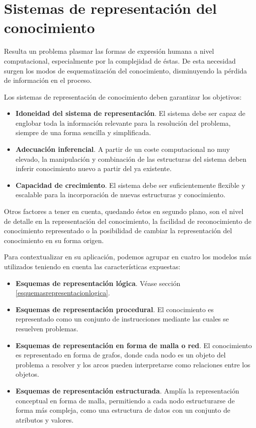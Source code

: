 \documentclass[a4paper, 11pt, titlepage]{article}
\begin{document}

\section{Sistemas de representación del conocimiento}

    Resulta un problema plasmar las formas de expresión humana a nivel computacional, especialmente
    por la complejidad de éstas. De esta necesidad surgen los modos de esquematización del 
    conocimiento, disminuyendo la pérdida de información en el proceso.

    Los sistemas de representación de conocimiento deben garantizar los objetivos:

    \begin{itemize}
        \item \textbf{Idoneidad del sistema de representación}. El sistema debe ser capaz de 
        englobar toda la información relevante para la resolución del problema, siempre de una 
        forma sencilla y simplificada.
        \item \textbf{Adecuación inferencial}. A partir de un coste computacional no muy elevado,
        la manipulación y combinación de las estructuras del sistema deben inferir conocimiento 
        nuevo a partir del ya existente.
        \item \textbf{Capacidad de crecimiento}. El sistema debe ser suficientemente flexible y 
        escalable para la incorporación de nuevas estructuras y conocimiento.
    \end{itemize}

    Otros factores a tener en cuenta, quedando éstos en segundo plano, son el nivel de detalle 
    en la representación del conocimiento, la facilidad de reconocimiento de conocimiento 
    representado o la posibilidad de cambiar la representación del conocimiento en su forma 
    origen.

    Para contextualizar en su aplicación, podemos agrupar en cuatro los modelos más utilizados 
    teniendo en cuenta las características expuestas:

    \begin{itemize}
        \item \textbf{Esquemas de representación lógica}. Véase sección \ref{esquemasrepresentacionlogica}.
        \item \textbf{Esquemas de representación procedural}. El conocimiento es representado 
        como un conjunto de instrucciones mediante las cuales se resuelven problemas.
        \item \textbf{Esquemas de representación en forma de malla o red}. El conocimiento 
        es representado en forma de grafos, donde cada nodo es un objeto del problema a 
        resolver y los arcos pueden interpretarse como relaciones entre los objetos.
        \item \textbf{Esquemas de representación estructurada}. Amplía la representación 
        conceptual en forma de malla, permitiendo a cada nodo estructurarse de forma más 
        compleja, como una estructura de datos con un conjunto de atributos y valores.
    \end{itemize}
\end{document}
